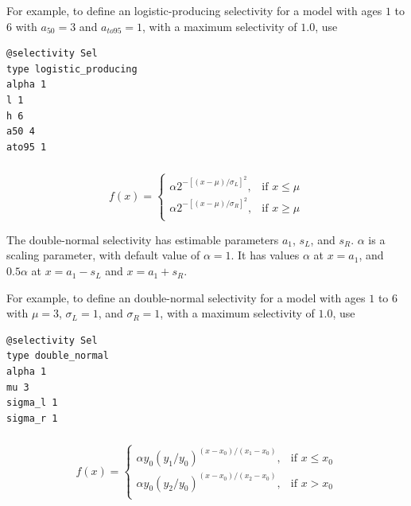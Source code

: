 For example, to define an logistic-producing selectivity for a model with ages $1$ to $6$ with $a_{50}=3$ and $a_{to95}=1$, with a maximum selectivity of $1.0$, use

{\small{\begin{verbatim}
@selectivity Sel
type logistic_producing
alpha 1
l 1 
h 6
a50 4
ato95 1
\end{verbatim}}}

\subsubsection[Double-normal]{}

\begin{equation}
  f(x) = \begin{cases}
    \alpha 2^{-[(x- \mu)/\sigma_L ]^2}, & \text{if $x \leq \mu$} \\
    \alpha 2^{-[(x- \mu)/\sigma_R ]^2}, & \text{if $x \ge \mu$}\\
  \end{cases}
\end{equation} 

The double-normal selectivity has estimable parameters $a_1$, $s_L$, and $s_R$. $\alpha$ is a scaling parameter, with default value of $\alpha = 1$. It has values $\alpha$ at $x=a_1$, and $0.5 \alpha$ at $x=a_1-s_L$ and $x=a_1+s_R$. 

For example, to define an double-normal selectivity for a model with ages $1$ to $6$ with $\mu=3$, $\sigma_L=1$, and $\sigma_R=1$, with a maximum selectivity of $1.0$, use

{\small{\begin{verbatim}
@selectivity Sel
type double_normal
alpha 1
mu 3
sigma_l 1
sigma_r 1
\end{verbatim}}}

\subsubsection[Double-exponential]{}

\begin{equation} 
f(x)=\begin{cases}
	  \alpha y_0(y_1 / y_0)^{(x-x_0)/(x_1-x_0)}, & \text{if $x \le x_0$} \\
	  \alpha y_0(y_2 / y_0)^{(x-x_0)/(x_2-x_0)}, & \text{if $x > x_0$} \\
  \end{cases}
\end{equation}

